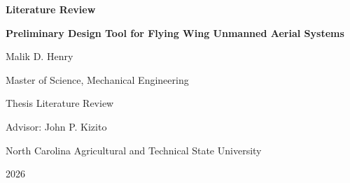 \documentclass[12pt]{report}
\begin{document}
\begin{titlepage}
  \centering
  {\Large\bfseries Literature Review\par}
  \vspace{0.25in}
  {\large\bfseries Preliminary Design Tool for Flying Wing Unmanned Aerial Systems\par}
  \vspace{1.0in}
  {\large Malik D. Henry\par}
  \vspace{0.25in}
  {\large Master of Science, Mechanical Engineering\par}
  \vspace{0.25in}
  {\large Thesis Literature Review\par}
  \vfill
  {\large Advisor: John P. Kizito\par}
  \vspace{0.15in}
  {\large North Carolina Agricultural and Technical State University\par}
  \vspace{0.15in}
  {\large 2026\par}
\end{titlepage}

\tableofcontents
\clearpage

\setcounter{page}{1}


\clearpage

\end{document}
